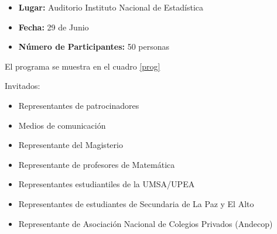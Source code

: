 \documentclass{article}
\begin{document}
\begin{itemize}
\item \textbf{Lugar:} Auditorio Instituto Nacional de Estadística
\item \textbf{Fecha:} 29 de Junio
\item \textbf{Número de Participantes:} 50 personas
\end{itemize}

El programa se muestra en el cuadro \ref{prog}

\begin{table}[!htp]
\caption{Programa para el evento de lanzamiento}
\label{prog}
\end{table}

Invitados:

\begin{itemize}
\item Representantes de patrocinadores 
\item Medios de comunicación
\item Representante del Magisterio
\item Representante de profesores de Matemática
\item Representantes estudiantiles de la UMSA/UPEA
\item Representantes de estudiantes de Secundaria de La Paz y El Alto
\item Representante de Asociación Nacional de Colegios Privados (Andecop)
\end{itemize}


\newpage
\end{document}
